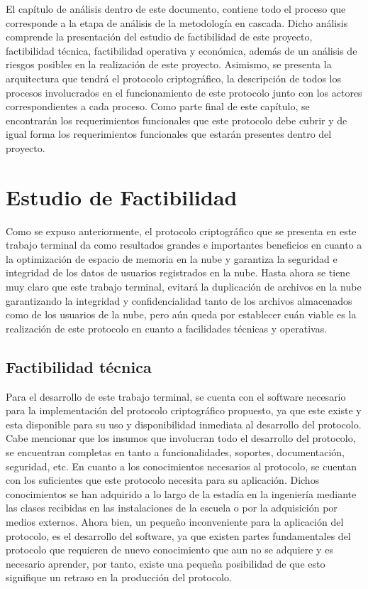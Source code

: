 
El capítulo de análisis dentro de este documento, contiene todo el proceso que corresponde a la etapa de análisis de la metodología en cascada. Dicho análisis comprende la presentación del estudio de factibilidad de este proyecto, factibilidad técnica, factibilidad operativa y económica, además de un análisis de riesgos posibles en la realización de este proyecto. Asimismo, se presenta la arquitectura que tendrá el protocolo criptográfico, la descripción de todos los procesos involucrados en el funcionamiento de este protocolo junto con los actores correspondientes a cada proceso. Como parte final de este capítulo, se encontrarán los requerimientos funcionales que este protocolo debe cubrir y de igual forma los requerimientos funcionales que estarán presentes dentro del proyecto. 






\section{Estudio de Factibilidad}

Como se expuso anteriormente, el protocolo criptográfico que se presenta en este trabajo terminal da como resultados grandes e importantes beneficios en cuanto a la optimización de espacio de memoria en la nube y garantiza la seguridad e integridad de los datos de usuarios registrados en la nube. Hasta ahora se tiene muy claro que este trabajo terminal, evitará la duplicación de archivos en la nube garantizando la integridad y confidencialidad tanto de los archivos almacenados como de los usuarios de la nube, pero aún queda por establecer cuán viable es la realización de este protocolo en cuanto a facilidades técnicas y operativas.


\subsection{Factibilidad técnica}

Para el desarrollo de este trabajo terminal, se cuenta con el software necesario para la implementación del protocolo criptográfico propuesto, ya que este existe y esta disponible para su uso y disponibilidad inmediata al desarrollo del protocolo. Cabe mencionar que los insumos que involucran todo el desarrollo del protocolo, se encuentran completas en tanto a funcionalidades, soportes, documentación, seguridad, etc. 
En cuanto a los conocimientos necesarios al protocolo, se cuentan con los suficientes que este protocolo necesita para su aplicación. Dichos conocimientos se han adquirido a lo largo de la estadía en la ingeniería mediante las clases recibidas en las instalaciones de la escuela o por la adquisición por medios externos. Ahora bien, un pequeño inconveniente para la aplicación del protocolo, es el desarrollo del software, ya que existen partes fundamentales del protocolo que requieren de nuevo conocimiento que aun no se adquiere y es necesario aprender, por tanto, existe una pequeña posibilidad de que esto signifique un retraso en la producción del protocolo. 

